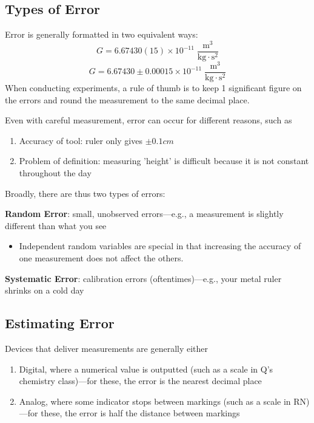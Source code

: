 \documentclass[../PhysicsFormulae.tex]{subfiles}
\begin{document}
\subsection{Types of Error}
Error is generally formatted in two equivalent ways:
\[ G = 6.67430(15) \times 10^{-11} \; \mathrm{\frac{m^3}{kg \cdot s^2}} \]
\[ G = 6.67430 \pm 0.00015 \times 10^{-11} \; \mathrm{\frac{m^3}{kg \cdot s^2}} \]
When conducting experiments, a rule of thumb is to keep 1 significant figure on the errors and round the measurement to the same decimal place. \bigskip 

Even with careful measurement, error can occur for different reasons, such as
\begin{enumerate}
    \itemsep0em
    \item Accuracy of tool: ruler only gives $\pm 0.1 cm$
    \item Problem of definition: measuring 'height' is difficult because it is not constant throughout the day
\end{enumerate}
Broadly, there are thus two types of errors:

\textbf{Random Error}: small, unobserved errors---e.g., a measurement is slightly different than what you see
\begin{itemize}
    \item Independent random variables are special in that increasing the accuracy of one measurement does not affect the others. 
\end{itemize}
\textbf{Systematic Error}: calibration errors (oftentimes)---e.g., your metal ruler shrinks on a cold day

\subsection{Estimating Error}
Devices that deliver measurements are generally either
\begin{enumerate}
    \itemsep0em
    \item Digital, where a numerical value is outputted (such as a scale in Q's chemistry class)---for these, the error is the nearest decimal place
    \item Analog, where some indicator stops between markings (such as a scale in RN)---for these, the error is half the distance between markings
\end{enumerate}
\end{document}
